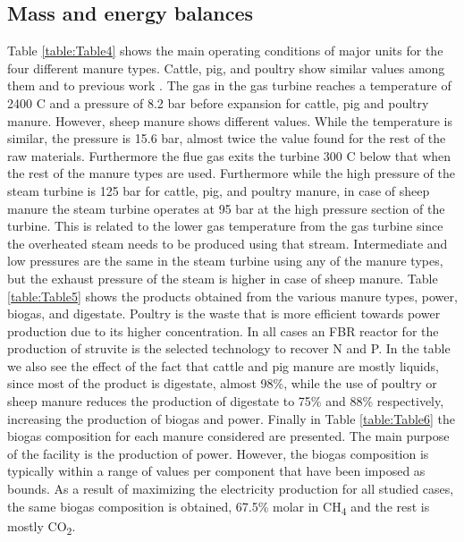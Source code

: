 \begin{refsection}[referencesCh2]
\subsection{Mass and energy balances} \label{section:Balanaces}
Table \ref{table:Table4} shows the main operating conditions of major units for the four different manure types. Cattle, pig, and poultry show similar values among them and to previous work \citep{Leon}. The gas in the gas turbine reaches a temperature of 2400 \textdegree C and a pressure of 8.2 bar before expansion for cattle, pig and poultry manure. However, sheep manure shows different values. While the temperature is similar, the pressure is 15.6 bar, almost twice the value found for the rest of the raw materials. Furthermore the flue gas exits the turbine 300 \textdegree C below that when the rest of the manure types are used. Furthermore while the high pressure of the steam turbine is 125 bar for cattle, pig, and poultry manure, in case of sheep manure the steam turbine operates at 95 bar at the high pressure section of the turbine. This is related to the lower gas temperature from the gas turbine since the overheated steam needs to be produced using that stream. Intermediate and low pressures are the same in the steam turbine using any of the manure types, but the exhaust pressure of the steam is higher in case of sheep manure. Table \ref{table:Table5} shows the products obtained from the various manure types, power, biogas, and digestate. Poultry is the waste that is more efficient towards power production due to its higher concentration. In all cases an FBR reactor for the production of struvite is the selected technology to recover N and P. In the table we also see the effect of the fact that cattle and pig manure are mostly liquids, since most of the product is digestate, almost 98\%, while the use of poultry or sheep manure reduces the production of digestate to 75\% and 88\% respectively, increasing the production of biogas and power. Finally in Table \ref{table:Table6} the biogas composition for each manure considered are presented. The main purpose of the facility is the production of power. However, the biogas composition is typically within a range of values per component that have been imposed as bounds. As a result of maximizing the electricity production for all studied cases, the same biogas composition is obtained, 67.5\% molar in CH\textsubscript{4} and the rest is mostly CO\textsubscript{2}.


\end{refsection}
